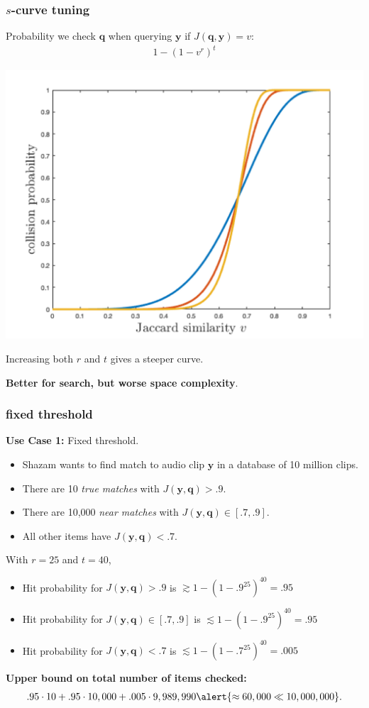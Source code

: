 \documentclass[compress]{beamer}
\newcommand{\bv}[1]{\mathbf{#1}}
\begin{document}
\begin{frame}
	\frametitle{$s$-curve tuning}
	Probability we check $\bv{q}$ when querying $\bv{y}$ if $J(\bv{q},\bv{y}) = v$:
	\begin{align*}
	1 - (1 - v^r)^t
	\end{align*}
	\begin{center}
		\includegraphics[width=.6\textwidth]{scurve_centered.png}
		
		Increasing both $r$ and $t$ gives a steeper curve. 
		
		\alert{\textbf{Better for search, but worse space complexity}.}
	\end{center}
\end{frame}

\begin{frame}
	\frametitle{fixed threshold}
	\small
	\textbf{Use Case 1:} Fixed threshold.
	\begin{itemize}
		\item Shazam wants to find match to audio clip $\bv{y}$ in a database of 10 million  clips.
		\item There are 10 \emph{true matches} with $J(\bv{y},\bv{q}) > .9$.
		\item There are 10,000 \emph{near matches} with $J(\bv{y},\bv{q}) \in [.7,.9]$.
		\item All other items have $J(\bv{y},\bv{q}) < .7$.
	\end{itemize}
	With $r = 25$ and $t = 40$, 
	\begin{itemize}
		\item Hit probability for $J(\bv{y},\bv{q}) > .9$ is $\gtrsim 1 - (1 - .9^{25})^{40} = .95$
		\item Hit probability for $J(\bv{y},\bv{q}) \in [.7,.9]$ is $\lesssim 1 - (1 - .9^{25})^{40} = .95$
		\item Hit probability for $J(\bv{y},\bv{q}) < .7$ is $\lesssim 1 - (1 - .7^{25})^{40} = .005$
	\end{itemize}
	\textbf{Upper bound on total number of items checked:} 
	\begin{align*}
	.95\cdot 10 + .95 \cdot 10,000 + .005 \cdot 9,989,990 \alert{\approx 60,000 \ll 10,000,000}.
	\end{align*}  
\end{frame}
\end{document}
